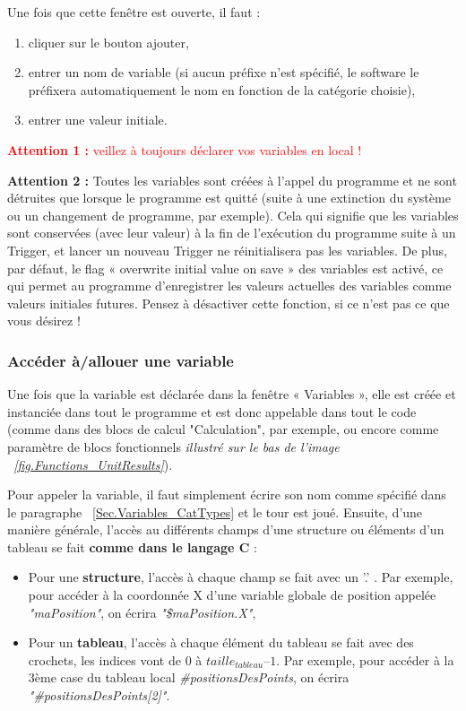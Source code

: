 \noindent Une fois que cette fenêtre est ouverte, il faut :
\begin{enumerate}
  \item cliquer sur le bouton ajouter,
  \item entrer un nom de variable (si aucun préfixe n’est spécifié, le software 
  le préfixera automatiquement le nom en fonction de la catégorie choisie),
  \item entrer une valeur initiale.
\end{enumerate}
\vspace{0.2cm}

\noindent
\textcolor{red}{\textbf{Attention 1 :} veillez à toujours déclarer vos variables en local !}
\vspace{0.2cm}

\noindent
\textbf{Attention 2 :} Toutes les variables sont créées à l’appel du programme et ne sont détruites que lorsque le programme est quitté (suite à une extinction du système ou un changement de programme, par exemple). Cela qui signifie que les variables sont conservées (avec leur valeur) à la fin de l’exécution du programme suite à un Trigger, et lancer un nouveau Trigger ne réinitialisera pas les variables. De plus, par défaut, le flag « overwrite initial value on save » des variables est activé, ce qui permet au programme d’enregistrer les valeurs actuelles des variables comme valeurs initiales futures. Pensez à désactiver cette fonction, si ce n’est pas ce que vous désirez !\\


\subsubsection{Accéder à/allouer une variable}
\label{Sec.Variables_Allocation}
Une fois que la variable est déclarée dans la fenêtre « Variables », elle 
est créée et instanciée dans tout le programme et est donc appelable dans tout le code
(comme dans des blocs de calcul "Calculation", par exemple, ou encore comme 
paramètre de blocs fonctionnels \textit{illustré sur le bas de l'image 
~\ref{fig.Functions_UnitResults}}).

Pour appeler la variable, il faut simplement écrire son nom comme spécifié dans le paragraphe ~\ref{Sec.Variables_CatTypes} et le tour est joué. Ensuite, d’une manière générale, l’accès au différents champs d’une structure ou éléments d’un tableau se fait \textbf{comme dans le langage C} :
\begin{itemize}
  \item Pour une \textbf{structure}, l’accès à chaque champ se fait avec un '.' . Par
  exemple, pour accéder à la coordonnée X d’une variable globale de position appelée
  \textit{"maPosition"}, on écrira \textit{"\$maPosition.X"},
  \item Pour un \textbf{tableau}, l’accès à chaque élément du tableau se fait avec 
  des crochets, les indices vont de 0 à $taille_{tableau} – 1$. Par exemple, pour
  accéder à la 3ème case du tableau local \textit{\#positionsDesPoints}, on écrira
  \textit{"\#positionsDesPoints[2]"}.
\end{itemize}


